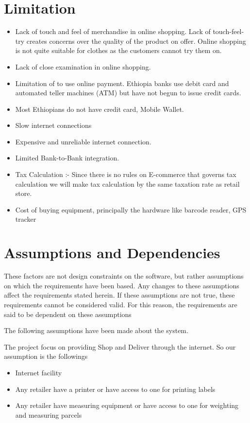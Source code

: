 \section{Limitation}
\begin{itemize}
	\item Lack of touch and feel of merchandise in online shopping. Lack of touch-feel-try creates concerns over the quality of the product on offer. Online shopping is not quite suitable for clothes as the customers cannot try them on.
	\item Lack of close examination in online shopping.
	\item Limitation of to use online payment. Ethiopia banks use debit card and automated teller machines (ATM) but have not begun to issue credit cards.
	\item Most Ethiopians do not have credit card, Mobile Wallet.
	\item Slow internet connections 
	\item Expensive and unreliable internet connection.
	\item Limited Bank-to-Bank integration.
	\item Tax Calculation :- Since there is no rules on E-commerce that governs tax calculation we will make tax calculation by the same taxation rate as retail store.
	\item Cost of buying equipment, principally the hardware like barcode reader, GPS tracker 
\end{itemize}

\section{Assumptions and Dependencies}
These factors are not design constraints on the software, but rather assumptions on which the requirements have been based. Any changes to these assumptions affect the requirements stated herein. If these assumptions are not true, these requirements cannot be considered valid. For this reason, the requirements are said to be dependent on these assumptions

The following assumptions have been made about the system.

The project focus on providing Shop and Deliver through the internet. So our assumption is the followings
\begin{itemize}
	\item Internet facility
	\item Any retailer have a printer or have access to one for printing labels
	\item Any retailer have measuring equipment or have access to one for weighting and measuring parcels
\end{itemize}

